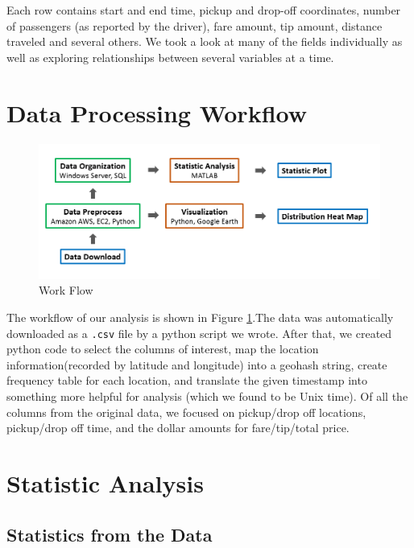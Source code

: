 \documentclass{article}
\begin{document}
Each row contains start and end time, pickup and drop-off coordinates, number of passengers (as reported by the driver), fare amount, tip amount, distance traveled and several others. We took a look at many of the fields individually as well as exploring relationships between several variables at a time.


\section{Data Processing Workflow}

\begin{figure}[H]
\centering
\includegraphics[width = .9\linewidth]{workfolw}
\caption{Work Flow}
\label{fig:workflow}
\end{figure}

The workflow of our analysis is shown in Figure \ref{fig:workflow}.The data was automatically downloaded as a {\tt .csv} file by a python script we wrote. After that, we created python code to select the columns of interest, map the location information(recorded by latitude and longitude) into a geohash string, create frequency table for each location, and translate the given timestamp into something more helpful for analysis (which we found to be Unix time). Of all the columns from the original data, we focused on pickup/drop off locations, pickup/drop off time, and the dollar amounts for fare/tip/total price. 



\section{Statistic Analysis}
\subsection{Statistics from the Data}
\end{document}
